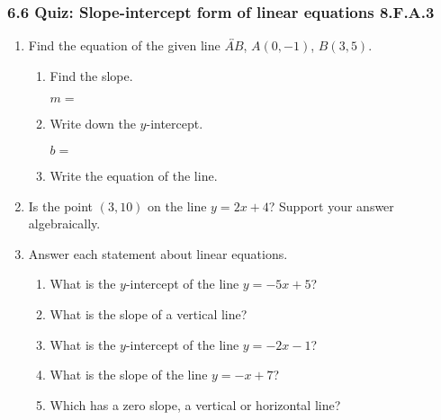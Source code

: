 

\fancyhead[LE]{\thepage}



\subsubsection*{6.6 Quiz: Slope-intercept form of linear equations \hfill 8.F.A.3}
\begin{enumerate}

\item Find the equation of the given line $\overleftrightarrow{AB}$, $A(0,-1)$, $B(3,5)$.
\begin{multicols}{2}
    \begin{enumerate}[itemsep=0.5cm]
      \item Find the slope. \par
          $m=$
      \item Write down the $y$-intercept. \par 
        $b=$
      \item Write the equation of the line. \vspace{1cm}
      \end{enumerate}
    \begin{flushright}
    \end{flushright}
  \end{multicols}

\item Is the point $(3,10)$ on the line $y=2x+4$? Support your answer algebraically. \vspace{3cm}

\item Answer each statement about linear equations.
\begin{enumerate}[itemsep=0.25cm]
  \item What is the $y$-intercept of the line $y = -5x+5$?
  \item What is the slope of a vertical line?
  \item What is the $y$-intercept of the line $y = -2x-1$?
  \item What is the slope of the line $y = -x+7$?
  \item Which has a zero slope, a vertical or horizontal line?
\end{enumerate} \vspace{0.5cm}


\end{enumerate}
